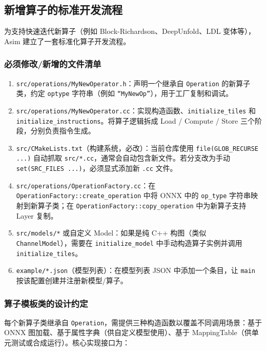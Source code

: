 \documentclass{CjC}
\begin{document}
\subsection{新增算子的标准开发流程}

为支持快速迭代新算子（例如 Block-Richardson、DeepUnfold、LDL 变体等），Asim 建立了一套标准化算子开发流程。

\subsubsection{必须修改/新增的文件清单}

\begin{enumerate}
    \item \texttt{src/operations/MyNewOperator.h}：声明一个继承自 \texttt{Operation} 的新算子类，约定 \texttt{optype} 字符串（例如 \texttt{``MyNewOp''}），用于工厂复制和调试。
    \item \texttt{src/operations/MyNewOperator.cc}：实现构造函数、\texttt{initialize\_tiles} 和 \texttt{initialize\_instructions}。将算子逻辑拆成 Load / Compute / Store 三个阶段，分别负责指令生成。
    \item \texttt{src/CMakeLists.txt}（构建系统，必改）：当前仓库使用 \texttt{file(GLOB\_RECURSE ...)} 自动抓取 \texttt{src/*.cc}，通常会自动包含新文件。若分支改为手动 \texttt{set(SRC\_FILES ...)}，必须显式添加新 \texttt{.cc} 文件。
    \item \texttt{src/operations/OperationFactory.cc}：在 \texttt{OperationFactory::create\_operation} 中将 ONNX 中的 \texttt{op\_type} 字符串映射到新算子类；在 \texttt{OperationFactory::copy\_operation} 中为新算子支持 Layer 复制。
    \item \texttt{src/models/*} 或自定义 Model：如果是纯 C++ 构图（类似 \texttt{ChannelModel}），需要在 \texttt{initialize\_model} 中手动构造算子实例并调用 \texttt{initialize\_tiles}。
    \item \texttt{example/*.json}（模型列表）：在模型列表 JSON 中添加一个条目，让 \texttt{main} 按该配置创建并注册新模型/算子。
\end{enumerate}

\subsubsection{算子模板类的设计约定}

每个新算子类继承自 \texttt{Operation}，需提供三种构造函数以覆盖不同调用场景：基于 ONNX 图加载、基于属性字典（供自定义模型使用）、基于 MappingTable（供单元测试或合成运行）。核心实现接口为：
\end{document}
